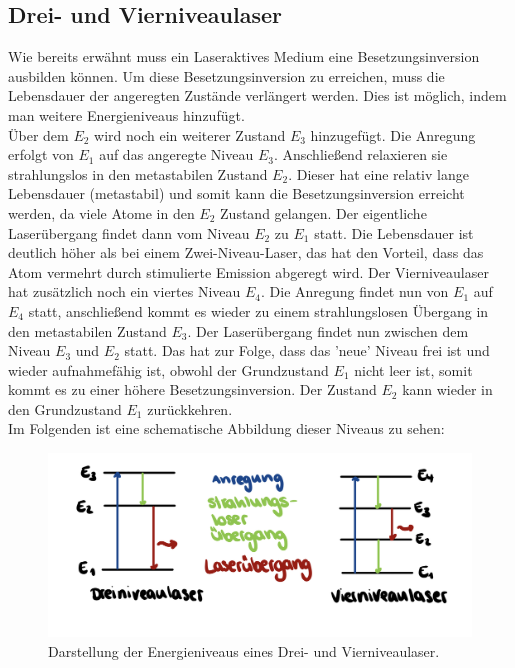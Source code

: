 \subsection{Drei- und Vierniveaulaser}
Wie bereits erwähnt muss ein Laseraktives Medium eine Besetzungsinversion ausbilden können.
Um diese Besetzungsinversion zu erreichen, muss die Lebensdauer der angeregten Zustände verlängert werden. 
Dies ist möglich, indem man weitere Energieniveaus hinzufügt.\\
Über dem $E_2$ wird noch ein weiterer Zustand $E_3$ hinzugefügt. 
Die Anregung erfolgt von $E_1$ auf das angeregte Niveau $E_3$. Anschließend
relaxieren sie strahlungslos in den metastabilen Zustand $E_2$. 
Dieser hat eine relativ lange Lebensdauer (metastabil) und somit kann die 
Besetzungsinversion erreicht werden, da viele Atome in den $E_2$ Zustand
gelangen. Der eigentliche Laserübergang findet dann vom Niveau $E_2$ zu $E_1$ statt. 
Die Lebensdauer ist deutlich höher als bei einem Zwei-Niveau-Laser, das hat den
Vorteil, dass das Atom vermehrt durch stimulierte Emission abgeregt wird.
Der Vierniveaulaser hat zusätzlich noch ein viertes Niveau $E_4$. 
Die Anregung findet nun von $E_1$ auf $E_4$ statt, anschließend kommt es wieder zu einem strahlungslosen
Übergang in den metastabilen Zustand $E_3$. 
Der Laserübergang findet nun zwischen dem Niveau $E_3$ und $E_2$ statt. 
Das hat zur Folge, dass das 'neue' Niveau frei ist und wieder
aufnahmefähig ist, obwohl der Grundzustand $E_1$ nicht leer ist, somit kommt es zu einer
höhere Besetzungsinversion. Der Zustand $E_2$ kann wieder in den Grundzustand $E_1$ zurückkehren. \citep[vgl.][]{laser3}\\
Im Folgenden ist eine schematische Abbildung dieser Niveaus zu sehen:\\
\begin{figure}[h]
    \centering
    \includegraphics[scale=0.13]{Bilder/FzV/34Niveau.jpeg}
    \caption{Darstellung der Energieniveaus eines Drei- und Vierniveaulaser.}
\end{figure}



